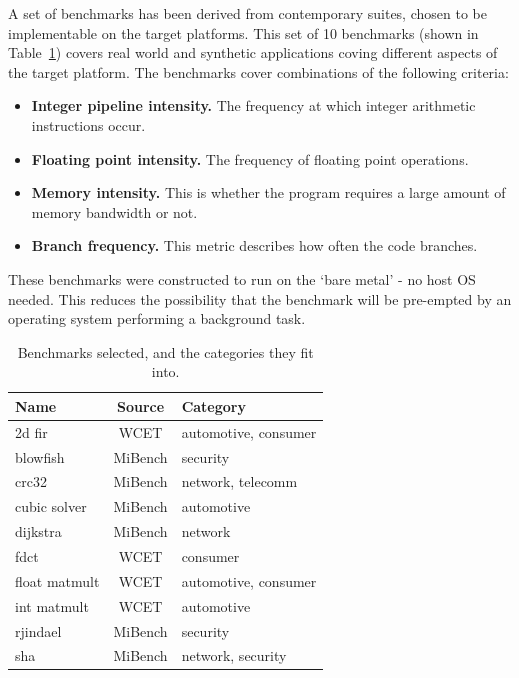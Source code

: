 \documentclass[twocolumn]{article}
\begin{document}
A set of benchmarks has been derived from contemporary suites, chosen to be implementable on the target platforms. This set of 10 benchmarks (shown in Table~\ref{Table:Benchmarks}) covers real world and synthetic applications coving different aspects of the target platform. The benchmarks cover combinations of the following criteria:
\begin{itemize}
	\setlength{\itemsep}{0em}
	\vspace{-1mm}
	\item \textbf{Integer pipeline intensity.} The frequency at which integer arithmetic instructions occur.
	\item \textbf{Floating point intensity.} The frequency of floating point operations.
	\item \textbf{Memory intensity.} This is whether the program requires a large amount of memory bandwidth or not.
	\item \textbf{Branch frequency.} This metric describes how often the code branches.
\end{itemize}

These benchmarks were constructed to run on the `bare metal' - no host OS needed. This reduces the possibility that the benchmark will be pre-empted by an operating system performing a background task.

\begin{table}
	\centering
	\begin{tabular}{l c l}
	\textbf{Name}			& \textbf{Source} 	& \textbf{Category} \\
	\hline
	2d fir					& WCET 		& automotive, consumer	\\
	blowfish				& MiBench 	& security	\\
	crc32					& MiBench 	& network, telecomm	\\
	cubic solver			& MiBench 	& automotive	\\
	dijkstra				& MiBench 	& network	\\
	fdct					& WCET 		& consumer	\\
	float matmult			& WCET 		& automotive, consumer	\\
	int matmult				& WCET	 	& automotive	\\
	rjindael				& MiBench 	& security	\\
	sha						& MiBench 	& network, security	\\
	\end{tabular}
\caption{Benchmarks selected, and the categories they fit into.}
\label{Table:Benchmarks}
\end{table}
\end{document}
